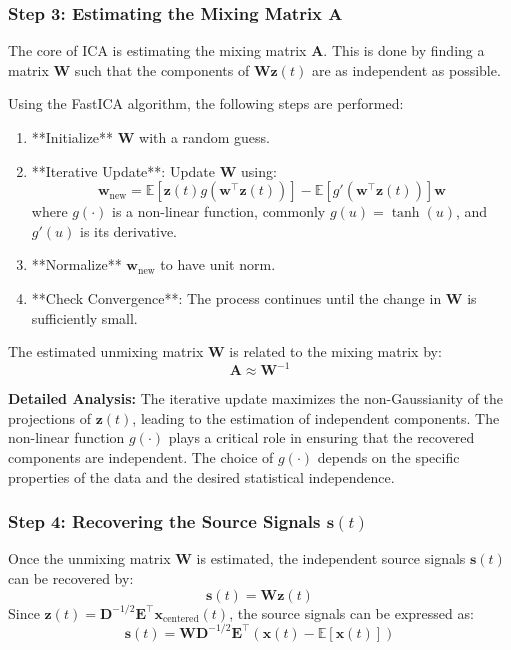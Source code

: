 \documentclass{exam}
\begin{document}
\subsubsection{Step 3: Estimating the Mixing Matrix \(\mathbf{A}\)}

The core of ICA is estimating the mixing matrix \( \mathbf{A} \). This is done by finding a matrix \( \mathbf{W} \) such that the components of \( \mathbf{W} \mathbf{z}(t) \) are as independent as possible.

Using the FastICA algorithm, the following steps are performed:

\begin{enumerate}
    \item **Initialize** \( \mathbf{W} \) with a random guess.
    \item **Iterative Update**: Update \( \mathbf{W} \) using:
    \[
    \mathbf{w}_{\text{new}} = \mathbb{E}[\mathbf{z}(t) g(\mathbf{w}^\top \mathbf{z}(t))] - \mathbb{E}[g'(\mathbf{w}^\top \mathbf{z}(t))] \mathbf{w}
    \]
    where \( g(\cdot) \) is a non-linear function, commonly \( g(u) = \tanh(u) \), and \( g'(u) \) is its derivative.
    \item **Normalize** \( \mathbf{w}_{\text{new}} \) to have unit norm.
    \item **Check Convergence**: The process continues until the change in \( \mathbf{W} \) is sufficiently small.
\end{enumerate}

The estimated unmixing matrix \( \mathbf{W} \) is related to the mixing matrix by:
\[
\mathbf{A} \approx \mathbf{W}^{-1}
\]

\textbf{Detailed Analysis:} The iterative update maximizes the non-Gaussianity of the projections of \( \mathbf{z}(t) \), leading to the estimation of independent components. The non-linear function \( g(\cdot) \) plays a critical role in ensuring that the recovered components are independent. The choice of \( g(\cdot) \) depends on the specific properties of the data and the desired statistical independence.

\subsubsection{Step 4: Recovering the Source Signals \(\mathbf{s}(t)\)}

Once the unmixing matrix \( \mathbf{W} \) is estimated, the independent source signals \( \mathbf{s}(t) \) can be recovered by:
\[
\mathbf{s}(t) = \mathbf{W} \mathbf{z}(t)
\]
Since \( \mathbf{z}(t) = \mathbf{D}^{-1/2} \mathbf{E}^\top \mathbf{x}_{\text{centered}}(t) \), the source signals can be expressed as:
\[
\mathbf{s}(t) = \mathbf{W} \mathbf{D}^{-1/2} \mathbf{E}^\top \left(\mathbf{x}(t) - \mathbb{E}[\mathbf{x}(t)]\right)
\]
\end{document}
